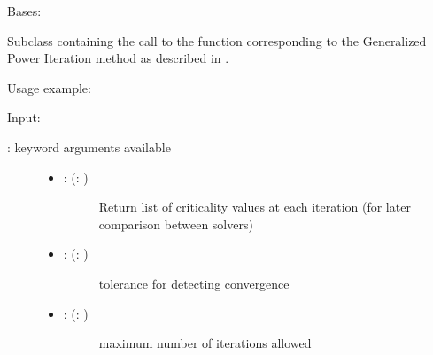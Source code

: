 \documentclass[a4paper,10pt,english]{sphinxmanual}
\begin{document}

\begin{fulllineitems}
\label{\detokenize{skprocrustes:skprocrustes.GPISolver}}
Bases: 

Subclass containing the call to the  function 
corresponding to the Generalized Power Iteration method as described in 
\label{\detokenize{skprocrustes:id11}}{\hyperref[\detokenize{skprocrustes:niezhanli17}]{\sphinxcrossref{{[}NZL17{]}}}}.

Usage example:

\begin{sphinxVerbatim}[commandchars=\\\{\}]
  
  
\end{sphinxVerbatim}

Input:
\begin{description}
\item[{: keyword arguments available}] \leavevmode\begin{itemize}
\item {} \begin{description}
\item[{: (: )}] \leavevmode
Return list of criticality values at each iteration (for later
comparison between solvers)

\end{description}

\item {} \begin{description}
\item[{: (: )}] \leavevmode
tolerance for detecting convergence

\end{description}

\item {} \begin{description}
\item[{: (: )}] \leavevmode
maximum number of iterations allowed


\end{description}
\end{itemize}
\end{description}
\end{fulllineitems}
\end{document}
